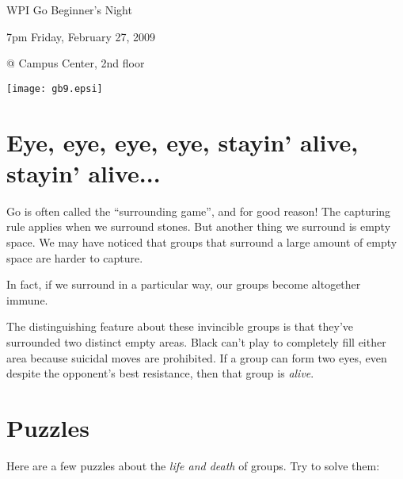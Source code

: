 \documentclass{article}
\begin{document}
\centerline{\Huge WPI Go Beginner's Night}
\centerline{\Huge 7pm Friday, February 27, 2009}
\centerline{\Huge @ Campus Center, 2nd floor}
\vfill

\begin{center}
\texttt{[image: gb9.epsi]}
\end{center}

\vfill

\newpage

\section*{Eye, eye, eye, eye, stayin' alive, stayin' alive...}

Go is often called the ``surrounding game'', and for good reason!  The
capturing rule applies when we surround stones.  But another thing we
surround is empty space.  We may have noticed that groups that
surround a large amount of empty space are harder to capture.

In fact, if we surround in a particular way, our groups
become altogether immune.
\begin{center}
\shortstack{
\cleargoban
\showgoban
}
\shortstack{
\cleargoban
\showgoban
}
\end{center}
The distinguishing feature about these invincible groups is that
they've surrounded two distinct empty areas.  Black can't play to
completely fill either area because suicidal moves are prohibited.  If
a group can form two eyes, even despite the opponent's best
resistance, then that group is \emph{alive}.


\section*{Puzzles}
Here are a few puzzles about the \emph{life and death} of groups.  Try to
solve them:
\begin{center}




\hspace{.3in}
\hspace{.3in}
\end{center}
\end{document}
